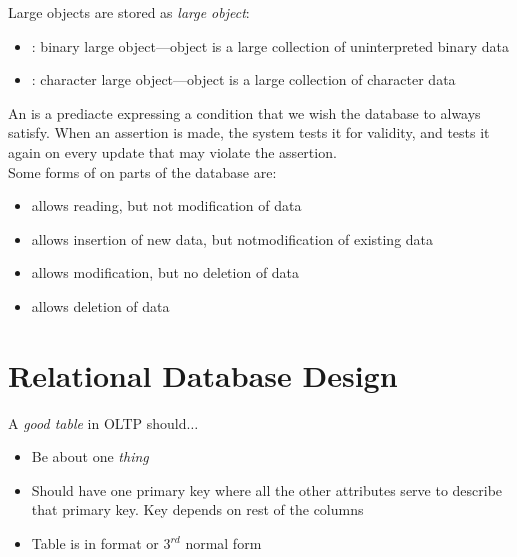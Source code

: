 \documentclass{article}
\begin{document}
Large objects are stored as \emph{large object}: 
\begin{itemize}
  \item {}: binary large object---object is a large collection of uninterpreted binary data 
  \item {}: character large object---object is a large collection of character data
\end{itemize}

An  is a prediacte expressing a condition that we wish the database to always satisfy. When an assertion is made, the system tests it for validity, and tests it again on every update that may violate the assertion. \\ 

Some forms of  on parts of the database are: 
\begin{itemize}
  \item {} allows reading, but not modification of data 
  \item {} allows insertion of new data, but notmodification of existing data 
  \item {} allows modification, but no deletion of data 
  \item {} allows deletion of data
\end{itemize}

\section{Relational Database Design}

A \emph{good table} in OLTP should$\dots$ 
\begin{itemize}
  \item Be about one \emph{thing} 
  \item Should have one primary key where all the other attributes serve to describe that primary key. Key depends on rest of the columns 
  \item Table is in  format or $3^{rd}$ normal form
\end{itemize}
\end{document}
